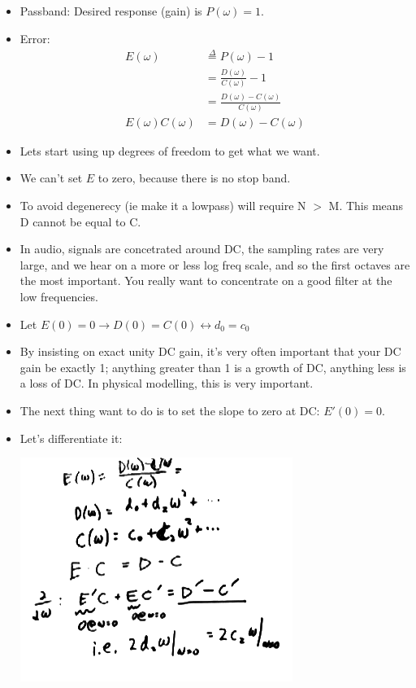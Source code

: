 \begin{itemize}
    \item{Passband: Desired response (gain) is $P(\omega) = 1$.}
    \item{Error: 
        \begin{align*}
            E(\omega) &\stackrel{\Delta}{=} P(\omega) - 1\\
            &= \frac{D(\omega)}{C(\omega)} - 1 \\
            &= \frac{D(\omega) - C(\omega)}{C(\omega)} \\
            E(\omega)C(\omega) &= D(\omega) - C(\omega)
        \end{align*}
    }

\item{Lets start using up degrees of freedom to get what we want. }

\item{We can't set $E$ to zero, because there is no stop band. }

\item{To avoid degenerecy (ie make it a lowpass) will require N $>$ M. This means
    D cannot be equal to C.}

\item{In audio, signals are concetrated around DC, the sampling rates are very large,
and we hear on a more or less log freq scale, and so the first octaves are
the most important. You really want to concentrate on a good filter at the low
frequencies.}

\item{Let $E(0) = 0 \rightarrow D(0) = C(0) \leftrightarrow d_0 = c_0$}

\item{By insisting on exact unity DC gain, it's very often important that your
DC gain be exactly 1; anything greater than 1 is a growth of DC, anything less
is a loss of DC. In physical modelling, this is very important.}

\item{The next thing want to do is to set the slope to zero at DC: $E'(0) = 0$.}

\item{Let's differentiate it:

\includegraphics[scale=0.5]{frames/14e}\\

}
\end{itemize}

